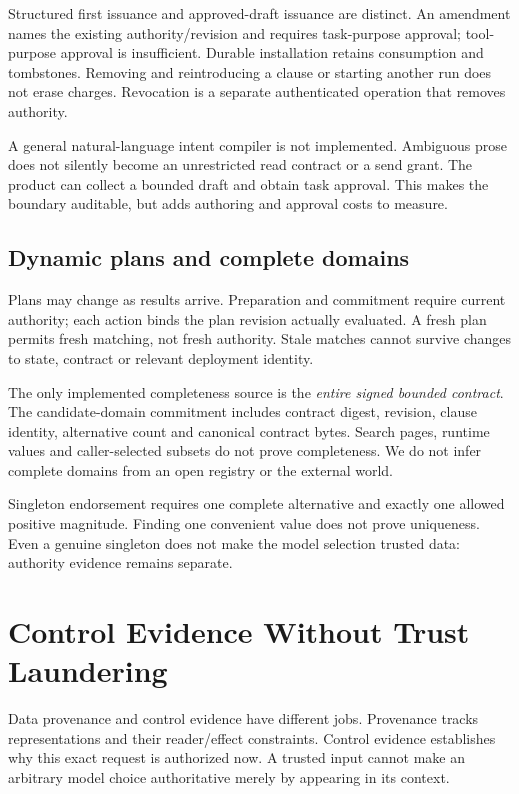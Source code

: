 \documentclass[letterpaper,twocolumn,10pt]{article}
\begin{document}
Structured first issuance and approved-draft issuance are distinct.
An amendment names the existing authority/revision and requires task-purpose
approval; tool-purpose approval is insufficient. Durable installation retains
consumption and tombstones. Removing and reintroducing a clause or starting
another run does not erase charges. Revocation is a separate authenticated
operation that removes authority.

A general natural-language intent compiler is not implemented. Ambiguous prose
does not silently become an unrestricted read contract or a send grant.
The product can collect a bounded draft and obtain task approval. This makes
the boundary auditable, but adds authoring and approval costs to measure.

\subsection{Dynamic plans and complete domains}

Plans may change as results arrive. Preparation and commitment require current
authority; each action binds the plan revision actually evaluated. A fresh plan
permits fresh matching, not fresh authority. Stale matches cannot survive changes
to state, contract or relevant deployment identity.

The only implemented completeness source is the \emph{entire signed bounded
contract}. The candidate-domain commitment includes contract digest, revision,
clause identity, alternative count and canonical contract bytes. Search pages,
runtime values and caller-selected subsets do not prove completeness. We do not
infer complete domains from an open registry or the external world.

Singleton endorsement requires one complete alternative and exactly one allowed
positive magnitude. Finding one convenient value does not prove uniqueness.
Even a genuine singleton does not make the model selection trusted data:
authority evidence remains separate.

\section{Control Evidence Without Trust Laundering}
\label{sec:endorsement}

Data provenance and control evidence have different jobs. Provenance tracks
representations and their reader/effect constraints. Control evidence establishes
why this exact request is authorized now. A trusted input cannot make an
arbitrary model choice authoritative merely by appearing in its context.
\end{document}
